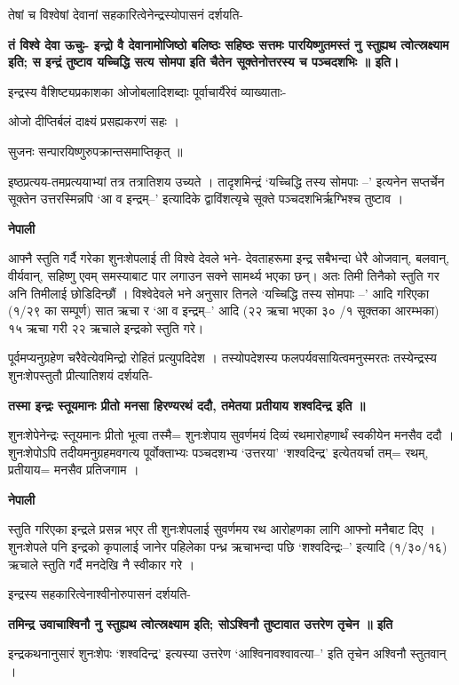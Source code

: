 \documentclass[11pt, a5paper]{article}
\begin{document}
तेषां  च विश्वेषां देवानां सहकारित्वेनेन्द्रस्योपासनं दर्शयति-

\textbf{तं विश्वे देवा ऊचुः- इन्द्रो वै देवानामोजिष्ठो बलिष्ठः सहिष्ठः सत्तमः पारयिष्णुतमस्तं नु स्तुह्यथ त्वोत्स्रक्ष्याम इति; स इन्द्रं तुष्टाव यच्चिद्धि सत्य सोमपा इति चैतेन सूक्तेनोत्तरस्य च पञ्चदशभिः ॥ इति।}

इन्द्रस्य वैशिष्ट्यप्रकाशका ओजोबलादिशब्दाः पूर्वाचार्यैरेवं व्याख्याताः-

ओजो दीप्तिर्बलं दाक्ष्यं प्रसह्यकरणं सहः ।

सुजनः सन्पारयिष्णुरुपक्रान्तसमाप्तिकृत् ॥

इष्ठप्रत्यय-तमप्रत्ययाभ्यां तत्र तत्रातिशय उच्यते । तादृशमिन्द्रं ‘यच्चिद्धि तस्य सोमपाः --’ इत्यनेन सप्तर्चेन सूक्तेन उत्तरस्मिन्नपि ‘आ व इन्द्रम्--’ इत्यादिके द्वाविंशत्यृचे सूक्ते पञ्चदशभिर्ऋग्भिश्च तुष्टाव ।

\textbf{नेपाली}

आफ्नै स्तुति गर्दै गरेका शुनःशेपलाई ती विश्वे देवले भने- देवताहरूमा इन्द्र सबैभन्दा धेरै ओजवान्, बलवान्, वीर्यवान्, सहिष्णु एवम् समस्याबाट पार लगाउन सक्ने सामर्थ्य भएका छन्। अतः तिमी तिनैको स्तुति गर अनि तिमीलाई छोडिदिन्छौं । विश्वेदेवले भने अनुसार तिनले ‘यच्चिद्धि तस्य सोमपाः --’ आदि गरिएका (१/२९ का सम्पूर्ण) सात ऋचा र ‘आ व इन्द्रम्--’ आदि  (२२ ऋचा भएका ३० /१ सूक्तका आरम्भका) १५ ऋचा गरी २२ ऋचाले  इन्द्रको स्तुति गरे।

पूर्वमप्यनुग्रहेण चरैवेत्येवमिन्द्रो रोहितं प्रत्युपदिदेश । तस्योपदेशस्य फलपर्यवसायित्वमनुस्मरतः तस्येन्द्रस्य शुनःशेपस्तुतौ प्रीत्यातिशयं दर्शयति-

\textbf{तस्मा इन्द्रः स्तूयमानः प्रीतो मनसा हिरण्यरथं ददौ, तमेतया प्रतीयाय शश्वदिन्द्र इति ॥}

शुनःशेपेनेन्द्रः स्तूयमानः प्रीतो भूत्वा तस्मै= शुनःशेपाय सुवर्णमयं दिव्यं रथमारोहणार्थं स्वकीयेन मनसैव ददौ । शुनःशेपोऽपि तदीयमनुग्रहमवगत्य पूर्वोक्ताभ्यः पञ्चदशभ्य ‘उत्तरया’ ‘शश्वदिन्द्र’ इत्येतयर्चा तम्= रथम्, प्रतीयाय= मनसैव प्रतिजगाम ।

\textbf{नेपाली}

स्तुति गरिएका इन्द्रले प्रसन्न भएर ती शुनःशेपलाई सुवर्णमय रथ आरोहणका लागि आफ्नो मनैबाट दिए । शुनःशेपले पनि इन्द्रको कृपालाई जानेर पहिलेका पन्ध्र ऋचाभन्दा पछि ‘शश्वदिन्द्रः--’ इत्यादि (१/३०/१६) ऋचाले स्तुति गर्दै मनदेखि नै स्वीकार गरे ।

इन्द्रस्य सहकारित्वेनाश्वीनोरुपासनं दर्शयति-

\textbf{तमिन्द्र उवाचाश्विनौ नु स्तुह्यथ त्वोत्स्रक्ष्याम इति; सोऽश्विनौ तुष्टावात उत्तरेण तृचेन ॥ इति}

इन्द्रकथनानुसारं शुनःशेपः ‘शश्वदिन्द्र’ इत्यस्या उत्तरेण ‘आश्विनावश्वावत्या--’ इति तृचेन अश्विनौ स्तुतवान् ।
\end{document}
